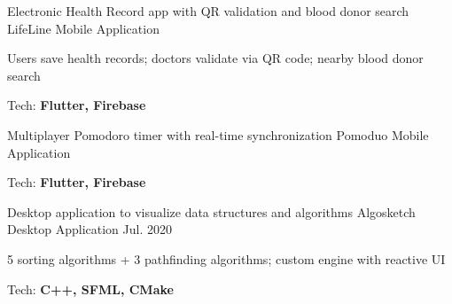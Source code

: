 \begin{cventries}
  \cventry
    {Electronic Health Record app with QR validation and blood donor search}
    {LifeLine}
    {Mobile Application}
    {}
    {
      \begin{cvitems}
        \item {Users save health records; doctors validate via QR code; nearby blood donor search}
        \item {Tech: \textbf{Flutter, Firebase}}
      \end{cvitems}
    }

  \cventry
    {Multiplayer Pomodoro timer with real-time synchronization}
    {Pomoduo}
    {Mobile Application}
    {}
    {
      \begin{cvitems}
        \item {Tech: \textbf{Flutter, Firebase}}
      \end{cvitems}
    }

  \cventry
    {Desktop application to visualize data structures and algorithms\enskip\textbullet{}}
    {Algosketch}
    {Desktop Application}
    {Jul. 2020}
    {
      \begin{cvitems}
        \item {5 sorting algorithms + 3 pathfinding algorithms; custom engine with reactive UI}
        \item {Tech: \textbf{C++, SFML, CMake}}
      \end{cvitems}
    }

\end{cventries}
